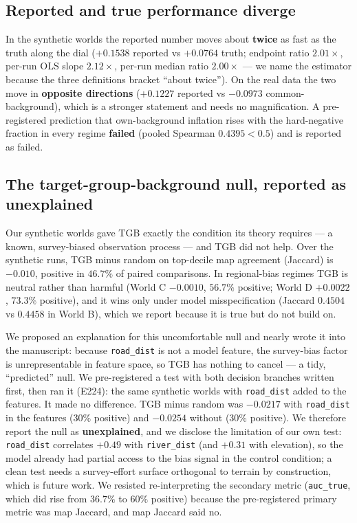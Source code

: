 \documentclass[12pt]{article}
\begin{document}
\subsection{Reported and true performance diverge}
\label{sec:diverge}

In the synthetic worlds the reported number moves about \textbf{twice} as fast as the truth along the dial ($+0.1538$ reported vs $+0.0764$ truth; endpoint ratio $2.01\times$, per-run OLS slope $2.12\times$, per-run median ratio $2.00\times$ --- we name the estimator because the three definitions bracket ``about twice'').
On the real data the two move in \textbf{opposite directions} ($+0.1227$ reported vs $-0.0973$ common-background), which is a stronger statement and needs no magnification.
A pre-registered prediction that own-background inflation rises with the hard-negative fraction in every regime \textbf{failed} (pooled Spearman $0.4395 < 0.5$) and is reported as failed.

\subsection{The target-group-background null, reported as unexplained}
\label{sec:tgbnull}

Our synthetic worlds gave TGB exactly the condition its theory requires --- a known, survey-biased observation process --- and TGB did not help.
Over the synthetic runs, TGB minus random on top-decile map agreement (Jaccard) is $-0.010$, positive in $46.7\%$ of paired comparisons.
In regional-bias regimes TGB is neutral rather than harmful (World C $-0.0010$, $56.7\%$ positive; World D $+0.0022$, $73.3\%$ positive), and it wins only under model misspecification (Jaccard $0.4504$ vs $0.4458$ in World B), which we report because it is true but do not build on.

We proposed an explanation for this uncomfortable null and nearly wrote it into the manuscript: because \texttt{road\_dist} is not a model feature, the survey-bias factor is unrepresentable in feature space, so TGB has nothing to cancel --- a tidy, ``predicted'' null.
We pre-registered a test with both decision branches written first, then ran it (E224): the same synthetic worlds with \texttt{road\_dist} added to the features.
It made no difference.
TGB minus random was $-0.0217$ with \texttt{road\_dist} in the features (30\% positive) and $-0.0254$ without (30\% positive).
We therefore report the null as \textbf{unexplained}, and we disclose the limitation of our own test: \texttt{road\_dist} correlates $+0.49$ with \texttt{river\_dist} (and $+0.31$ with elevation), so the model already had partial access to the bias signal in the control condition; a clean test needs a survey-effort surface orthogonal to terrain by construction, which is future work.
We resisted re-interpreting the secondary metric (\texttt{auc\_true}, which did rise from $36.7\%$ to $60\%$ positive) because the pre-registered primary metric was map Jaccard, and map Jaccard said no.
\end{document}
